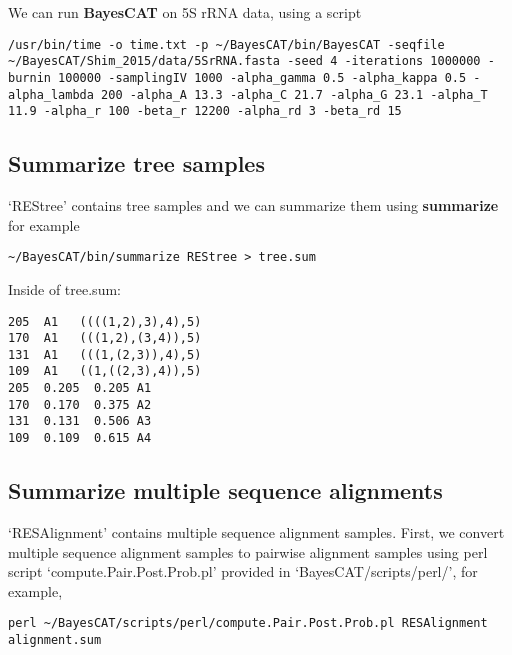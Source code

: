 \documentclass[11pt]{article}
\begin{document}
We can run \textbf{BayesCAT} on 5S rRNA data, using a script  
\begin{lstlisting}
/usr/bin/time -o time.txt -p ~/BayesCAT/bin/BayesCAT -seqfile ~/BayesCAT/Shim_2015/data/5SrRNA.fasta -seed 4 -iterations 1000000 -burnin 100000 -samplingIV 1000 -alpha_gamma 0.5 -alpha_kappa 0.5 -alpha_lambda 200 -alpha_A 13.3 -alpha_C 21.7 -alpha_G 23.1 -alpha_T 11.9 -alpha_r 100 -beta_r 12200 -alpha_rd 3 -beta_rd 15
\end{lstlisting}

\subsection{Summarize tree samples}
\label{sec-3-1}
`REStree' contains tree samples and we can summarize them using \textbf{summarize} for example
\begin{lstlisting}
~/BayesCAT/bin/summarize REStree > tree.sum
\end{lstlisting}

Inside of tree.sum:
\begin{lstlisting}
205  A1   ((((1,2),3),4),5)
170  A1   (((1,2),(3,4)),5)
131  A1   (((1,(2,3)),4),5)
109  A1   ((1,((2,3),4)),5)
205  0.205  0.205 A1
170  0.170  0.375 A2
131  0.131  0.506 A3
109  0.109  0.615 A4
\end{lstlisting}

\subsection{Summarize multiple sequence alignments}
\label{sec-3-2}
`RESAlignment' contains multiple sequence alignment samples. First, we convert multiple sequence alignment samples to pairwise alignment samples using perl script `compute.Pair.Post.Prob.pl' provided in `BayesCAT/scripts/perl/', for example,
\begin{lstlisting}
perl ~/BayesCAT/scripts/perl/compute.Pair.Post.Prob.pl RESAlignment alignment.sum
\end{lstlisting}
\end{document}
